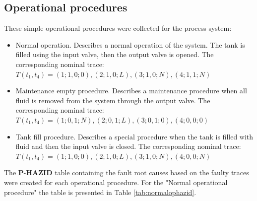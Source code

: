 \documentclass[conference]{IEEEtran}
\begin{document}
\subsection{Operational procedures}

These simple operational procedures were collected for the process system:
\begin{itemize}
\item Normal operation. Describes a normal operation of the system. The tank is filled using the input valve, then the output valve is opened. The corresponding nominal trace: \\
$T(t_1,t_4)=(1;1,0;0),(2;1,0;L),(3;1,0;N),(4;1,1;N)$
\item Maintenance empty procedure. Describes a maintenance procedure when all fluid is removed from the system through the output valve. The corresponding nominal trace: \\
$T(t_1,t_4)=(1;0,1;N),(2;0,1;L),(3;0,1;0),(4;0,0;0)$
\item Tank fill procedure. Describes a special procedure when the tank is filled with fluid and then the input valve is closed. The corresponding nominal trace: \\
$T(t_1,t_4)=(1;1,0;0),(2;1,0;L),(3;1,0;N),(4;0,0;N)$
\end{itemize}

The $\textbf{P-HAZID}$ table containing the fault root causes based on the faulty traces were created for each operational procedure. For the "Normal operational procedure" the table is presented in Table \ref{tab:normalophazid}.
\end{document}
